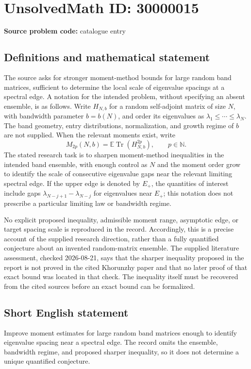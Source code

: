 \documentclass[11pt]{article}
\newcommand{\N}{\mathbb{N}}
\newcommand{\E}{\mathbb{E}}
\begin{document}
\section*{UnsolvedMath ID: 30000015}
\textbf{Source problem code:} catalogue entry
\subsection{Definitions and mathematical statement}
The source asks for stronger moment-method bounds for large random band matrices, sufficient to determine the local scale of eigenvalue spacings at a spectral edge. A notation for the intended problem, without specifying an absent ensemble, is as follows. Write \(H_{N,b}\) for a random self-adjoint matrix of size \(N\), with bandwidth parameter \(b=b(N)\), and order its eigenvalues as \(\lambda_1\leq\cdots\leq\lambda_N\). The band geometry, entry distributions, normalization, and growth regime of \(b\) are not supplied. When the relevant moments exist, write
\[
M_{2p}(N,b)=\E\operatorname{Tr}(H_{N,b}^{2p}),\qquad p\in\N.
\]
The stated research task is to sharpen moment-method inequalities in the intended band ensemble, with enough control as \(N\) and the moment order grow to identify the scale of consecutive eigenvalue gaps near the relevant limiting spectral edge. If the upper edge is denoted by \(E_+\), the quantities of interest include gaps \(\lambda_{N-j+1}-\lambda_{N-j}\) for eigenvalues near \(E_+\); this notation does not prescribe a particular limiting law or bandwidth regime.

No explicit proposed inequality, admissible moment range, asymptotic edge, or target spacing scale is reproduced in the record. Accordingly, this is a precise account of the supplied research direction, rather than a fully quantified conjecture about an invented random-matrix ensemble. The supplied literature assessment, checked 2026-08-21, says that the sharper inequality proposed in the report is not proved in the cited Khorunzhy paper and that no later proof of that exact bound was located in that check. The inequality itself must be recovered from the cited sources before an exact bound can be formalized.
\subsection{Short English statement}
Improve moment estimates for large random band matrices enough to identify eigenvalue spacing near a spectral edge. The record omits the ensemble, bandwidth regime, and proposed sharper inequality, so it does not determine a unique quantified conjecture.
\end{document}

